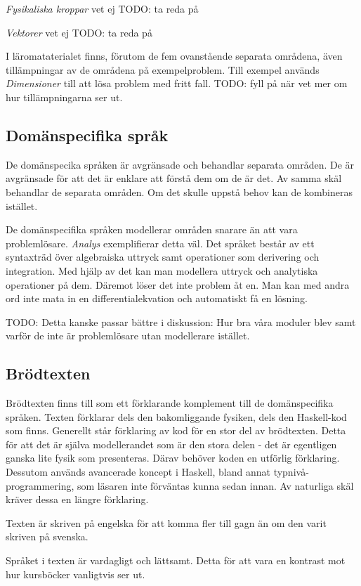 \begin{binge}
\textit{Fysikaliska kroppar} vet ej TODO: ta reda på

\textit{Vektorer} vet ej TODO: ta reda på

I läromataterialet finns, förutom de fem ovanstående separata områdena, även tillämpningar av de områdena på exempelproblem. Till exempel används \textit{Dimensioner} till att lösa problem med fritt fall. TODO: fyll på när vet mer om hur tillämpningarna ser ut.
\subsection{Domänspecifika språk}

De domänspecika språken är avgränsade och behandlar separata områden. De är avgränsade för att det är enklare att förstå dem om de är det. Av samma skäl behandlar de separata områden. Om det skulle uppstå behov kan de kombineras istället.

De domänspecifika språken modellerar områden snarare än att vara problemlösare. \textit{Analys} exemplifierar detta väl. Det språket består av ett syntaxträd över algebraiska uttryck samt operationer som derivering och integration. Med hjälp av det kan man modellera uttryck och analytiska operationer på dem. Däremot löser det inte problem åt en. Man kan med andra ord inte mata in en differentialekvation och automatiskt få en lösning.

TODO: Detta kanske passar bättre i diskussion: Hur bra våra moduler blev samt varför de inte är problemlösare utan modellerare istället.

\subsection{Brödtexten}

Brödtexten finns till som ett förklarande komplement till de domänspecifika språken. Texten förklarar dels den bakomliggande fysiken, dels den Haskell-kod som finns. Generellt står förklaring av kod för en stor del av brödtexten. Detta för att det är själva modellerandet som är den stora delen - det är egentligen ganska lite fysik som presenteras. Därav behöver koden en utförlig förklaring. Dessutom används avancerade koncept i Haskell, bland annat typnivå-programmering, som läsaren inte förväntas kunna sedan innan. Av naturliga skäl kräver dessa en längre förklaring.

Texten är skriven på engelska för att komma fler till gagn än om den varit skriven på svenska.

Språket i texten är vardagligt och lättsamt. Detta för att vara en kontrast mot hur kursböcker vanligtvis ser ut.


\end{binge}
